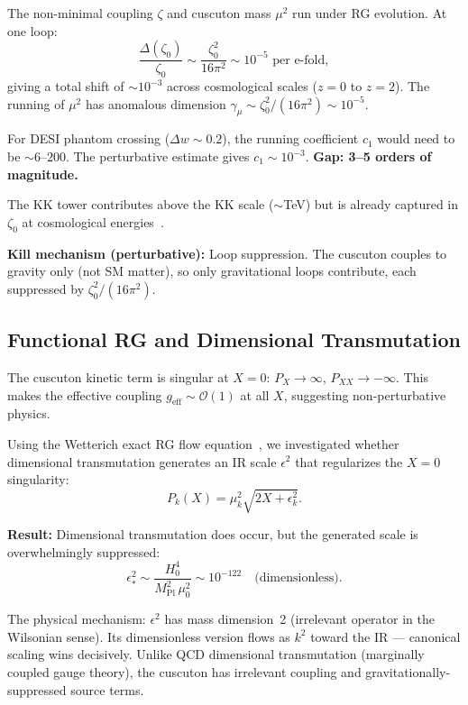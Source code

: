 The non-minimal coupling $\zeta$ and cuscuton mass $\mu^2$ run under RG evolution. At one loop:
\begin{equation}
  \frac{\Delta(\zeta_0)}{\zeta_0} \sim \frac{\zeta_0^2}{16\pi^2} \sim 10^{-5} \text{ per e-fold},
  \label{eq:3-21}
\end{equation}
giving a total shift of ${\sim}10^{-3}$ across cosmological scales ($z = 0$ to $z = 2$). The running of $\mu^2$ has anomalous dimension $\gamma_\mu \sim \zeta_0^2/(16\pi^2) \sim 10^{-5}$.

For DESI phantom crossing ($\Delta w \sim 0.2$), the running coefficient $c_1$ would need to be ${\sim}6$--$200$. The perturbative estimate gives $c_1 \sim 10^{-3}$. \textbf{Gap: 3--5 orders of magnitude.}

The KK tower contributes above the KK scale (${\sim}$TeV) but is already captured in $\zeta_0$ at cosmological energies~\cite{ch3:appelquist1983}.

\textbf{Kill mechanism (perturbative):} Loop suppression. The cuscuton couples to gravity only (not SM matter), so only gravitational loops contribute, each suppressed by $\zeta_0^2/(16\pi^2)$.

\subsection{Functional RG and Dimensional Transmutation}
\label{sec:3-frg}

The cuscuton kinetic term is singular at $X = 0$: $P_X \to \infty$, $P_{XX} \to -\infty$. This makes the effective coupling $g_{\mathrm{eff}} \sim \mathcal{O}(1)$ at all $X$, suggesting non-perturbative physics.

Using the Wetterich exact RG flow equation~\cite{ch3:wetterich1993}, we investigated whether dimensional transmutation generates an IR scale $\epsilon^2$ that regularizes the $X = 0$ singularity:
\begin{equation}
  P_k(X) = \mu_k^2\sqrt{2X + \epsilon_k^2}.
  \label{eq:3-22}
\end{equation}

\textbf{Result:} Dimensional transmutation does occur, but the generated scale is overwhelmingly suppressed:
\begin{equation}
  \epsilon^2_* \sim \frac{H_0^4}{M_{\mathrm{Pl}}^2\,\mu_0^2} \sim 10^{-122} \quad\text{(dimensionless)}.
  \label{eq:3-23}
\end{equation}

The physical mechanism: $\epsilon^2$ has mass dimension~2 (irrelevant operator in the Wilsonian sense). Its dimensionless version flows as $k^2$ toward the IR --- canonical scaling wins decisively. Unlike QCD dimensional transmutation (marginally coupled gauge theory), the cuscuton has irrelevant coupling and gravitationally-suppressed source terms.

